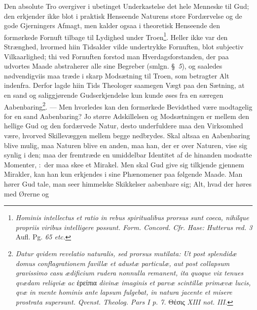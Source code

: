 \documentclass[12pt]{book}
\newcommand{\dsi}{\reflectbox{c}:}
\newcommand{\opage}[1]{\marginnote{\footnotesize\textit{[#1]}}}
\begin{document}
Den absolute Tro overgiver i ubetinget Underkastelse det hele Menneske til
Gud; den erkjender ikke blot i praktisk
\opage{75} \setcounter{footnote}{0}%
Henseende Naturens store Fordærvelse og de gode Gjerningers Afmagt, men
kalder ogsaa i theoretisk Henseende den formørkede Fornuft tilbage til
Lydighed under Troen\footnote{\textit{Hominis intellectus et ratio in rebus
spiritualibus prorsus sunt coeca, nihilque propriis viribus intelligere
possunt. Form. Concord. Cfr. Hase: Hutterus red. 3} Aufl. Pg. \textit{65
etc.}}. Heller ikke var den Strænghed, hvormed hiin Tidsalder vilde
undertrykke Fornuften, blot subjectiv Vilkaarlighed; thi ved Fornuften
forstod man Hverdagsforstanden, der paa udvortes Maade abstraherer alle sine
Begreber (smlgn. §~\textit{5}), og saaledes nødvendigviis maa træde i skarp
Modsætning til Troen, som betragter Alt indenfra. Derfor lagde hiin Tids
Theologer saamegen Vægt paa den Sætning, at en sand og saliggjørende
Gudserkjendelse kun kunde øses fra en særegen
Aabenbaring\footnote{\textit{Datur qvidem revelatio naturalis, sed prorsus
mutilata: Ut post splendidæ domus conflagrationem favillæ et adustæ
particulæ, aut post collapsum gravissimo casu ædificium rudera nonnulla
remanent, ita quoque vix tenues qvædam reliqviæ ac} ἐρείπια \textit{divinæ
imaginis et parvæ scintillæ primævæ lucis, qvæ in mente hominis ante lapsum
fulgebat, in natura jacente et misere prostrata supersunt. Qvenst. Theolog.
Pars I p. 7.} Θέσις \textit{XIII not. III.}}. --- Men hvorledes kan den
formørkede Bevidsthed være modtagelig for en sand Aabenbaring? Jo større
Adskillelsen og Modsætningen er mellem den hellige Gud og den fordærvede
Natur, desto underfuldere maa den Virksomhed være, hvorved Skillevæggen
mellem begge nedbrydes. Skal altsaa en Aabenbaring blive mulig, maa Naturen
blive en anden, maa han, der er over Naturen, vise sig synlig i den; maa der
fremtræde en umiddelbar Identitet af de hinanden modsatte Momenter, \dsi\ der
maa skee et Mirakel. Men skal Gud give sig tilkjende gjennem Mirakler, kan
han kun erkjendes i sine Phænomener paa følgende Maade. Man hører Gud tale,
man
\opage{76} \setcounter{footnote}{0}%
seer himmelske Skikkelser aabenbare sig; Alt, hvad der høres med Ørerne og
\end{document}
